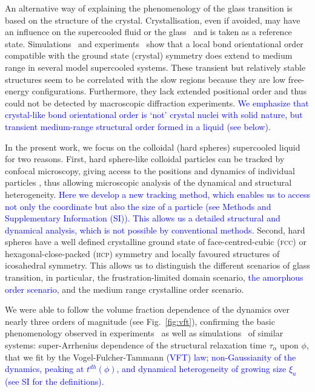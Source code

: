 An alternative way of explaining the phenomenology of the glass transition is based on the structure of the crystal. Crystallisation, even if avoided, may have an influence on the supercooled fluid or the glass~\citep{TanakaGJPCM, Cavagna2003, VanMegen2009a} and is taken as a reference state. Simulations~\cite{tanaka2010critical, Pedersen2010, Coslovich2011} and experiments~\citep{tanaka2010critical} show that a local bond orientational order compatible with the ground state (crystal) symmetry does extend to medium range in several model supercooled systems. These transient but relatively stable structures seem to be correlated with the slow regions because they are low free-energy configurations. Furthermore, they lack extended positional order and thus could not be detected by macroscopic diffraction experiments. \textcolor{blue}{We emphasize that crystal-like bond orientational order is `not' crystal nuclei with solid nature, but transient medium-range structural order formed in a liquid (see below)}. 

In the present work, we focus on the colloidal (hard spheres) supercooled liquid \cite{pusey1987ogt} for two reasons. First, hard sphere-like colloidal particles can be tracked by confocal microscopy, giving access to the positions and dynamics of individual particles \cite{kegel2000swe, weeks2000}, thus allowing microscopic analysis of the dynamical and structural heterogeneity. \textcolor{blue}{Here we develop a new tracking method, which enables us to access not only the coordinate but also the size of a particle (see Methods and Supplementary Information (SI)). This allows us a detailed structural and dynamical analysis, which is not possible by conventional methods.}  Second, hard spheres have a well defined crystalline ground state of face-centred-cubic (\textsc{fcc}) or hexagonal-close-packed (\textsc{hcp}) symmetry and locally favoured structures of icosahedral symmetry. This allows us to distinguish the different scenarios of glass transition, in particular, the frustration-limited domain scenario, \textcolor{blue}{the amorphous order scenario}, and the medium range crystalline order scenario.



We were able to follow the volume fraction dependence of the dynamics over nearly three orders of magnitude (see Fig.~\ref{fig:vft}), confirming the basic phenomenology observed in experiments~\citep{pusey1987ogt, kegel2000swe, weeks2000, BerthierR} as well as simulations~\citep{tanaka2010critical} of similar systems: super-Arrhenius dependence of the structural relaxation time $\tau_\alpha$ upon $\phi$, that we fit by the Vogel-Fulcher-Tammann \textcolor{blue}{(VFT) law; non-Gaussianity of the dynamics, peaking at $t^{dh}(\phi)$, and dynamical heterogeneity of growing size $\xi_u$ (see SI for the definitions).} 



